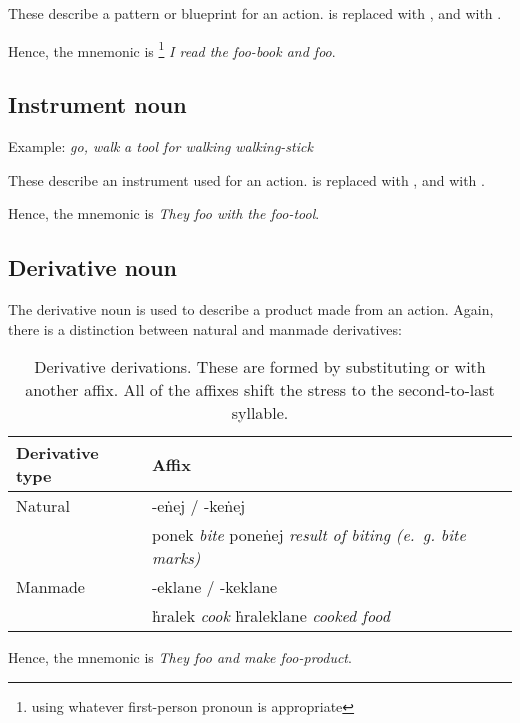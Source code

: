 \documentclass{book}
\begin{document}
These describe a pattern or blueprint for an action.  is replaced with , and  with .

Hence, the mnemonic is \footnote{using whatever first-person pronoun is appropriate} \emph{I read the foo-book and foo}.

\subsection{Instrument noun}

Example:  \emph{go, walk} \ra{}  \emph{a tool for walking} \ra{}  \emph{walking-stick}

These describe an instrument used for an action.  is replaced with , and  with .

Hence, the mnemonic is  \emph{They foo with the foo-tool}.

\subsection{Derivative noun}

The derivative noun is used to describe a product made from an action. Again, there is a distinction between natural and manmade derivatives:

\begin{table}[ht]
    \caption{Derivative derivations. These are formed by substituting  or  with another affix. All of the affixes shift the stress to the second-to-last syllable.}
    \centering
    \begin{tabular}{|l|l|l|}
        \hline
        Derivative type & Affix \\
        \hline
        Natural & -eṅej / -keṅej \\
        & ponek \emph{bite} \ra{} poneṅej \emph{result of biting (e.~g. bite marks)} \\
        \hline
        Manmade & -eklane / -keklane \\
        & ḣralek \emph{cook} \ra{} ḣraleklane \emph{cooked food} \\
        \hline
    \end{tabular}
\end{table}

Hence, the mnemonic is  \emph{They foo and make foo-product}.
\end{document}
